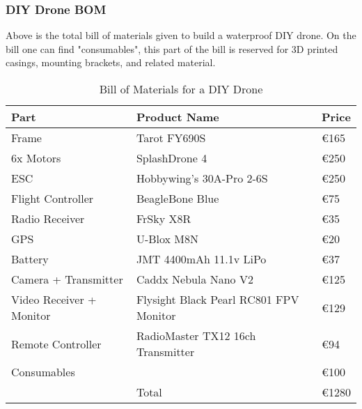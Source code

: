 \subsubsection{DIY Drone BOM}
Above is the total bill of materials given to build a waterproof DIY drone. On the bill one can find "consumables", this part of the bill is reserved for 3D printed casings, mounting brackets, and related material.
\begin{table}
\sffamily
\begin{center}
\begin{tabular}{ | m{4cm} | m{7cm}| m{1cm} | } 
  \hline
  Part & Product Name & Price \\ 
  \hline
  Frame & Tarot FY690S & €165 \\ 
  6x Motors & SplashDrone 4 & €250 \\ 
  ESC & Hobbywing's 30A-Pro 2-6S & €250 \\ 
  Flight Controller & BeagleBone Blue & €75 \\ 
  Radio Receiver & FrSky X8R & €35 \\
  GPS & U-Blox M8N & €20 \\
  Battery & JMT 4400mAh 11.1v LiPo & €37 \\
  Camera + Transmitter & Caddx Nebula Nano V2 & €125 \\
  Video Receiver + Monitor & Flysight Black Pearl RC801 FPV Monitor & €129 \\
  Remote Controller & RadioMaster TX12 16ch Transmitter & €94 \\
  Consumables & & €100 \\
  \hline
  &Total& €1280 \\
  \hline
\end{tabular}

\end{center}
\rmfamily\normalsize
\caption{Bill of Materials for a DIY Drone} \label{BOM} 
\end{table}